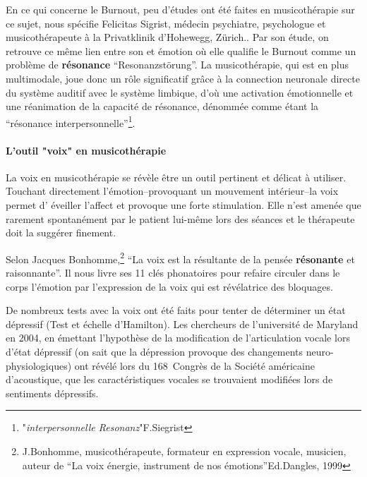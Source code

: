       En ce qui concerne le Burnout, peu d'études ont été faites en musicothérapie
sur ce sujet, nous spécifie Felicitas Sigrist, médecin
psychiatre, psychologue et musicothérapeute à la Privatklinik
d'Hohewegg, Zürich.\autocite[pp.55--90] {sigrist_burnout_2016}. Par son étude, on retrouve ce 
	même lien entre son et 
émotion où elle qualifie le Burnout comme un problème de \textbf{résonance} ``Resonanzstörung''. La 
musicothérapie, qui est en plus multimodale, joue donc un rôle significatif grâce à la 
connection 
neuronale directe du système auditif avec le système limbique, d'où une activation 
émotionnelle et une  réanimation de  la capacité de résonance, dénommée comme 
étant la 
``résonance interpersonnelle''\footnote{"\textit{interpersonnelle Resonanz}"F.Siegrist}.

\paragraph{L'outil "voix" en musicothérapie}

La voix en musicothérapie se révèle être un outil pertinent et délicat
à utiliser. Touchant 
directement 
l'émotion--provoquant un mouvement intérieur--la voix permet d'
éveiller l'affect
et provoque une forte stimulation. Elle n'est amenée que rarement
spontanément par le patient lui-même lors des séances et le thérapeute doit la suggérer
finement.

Selon Jacques Bonhomme,\footnote{J.Bonhomme, musicothérapeute, formateur 
  	en expression vocale, musicien, auteur de ``La voix énergie,
        instrument de nos émotions''Ed.Dangles, 1999} ``La voix est la
      résultante de la pensée \textbf{résonante}  et raisonnante''.
      Il nous livre ses 11 clés phonatoires pour refaire circuler dans
      le corps 
      l'émotion par l'expression de la voix qui est révélatrice des bloquages.

De nombreux tests avec 
la voix
 ont été faits pour tenter de déterminer un état dépressif 
(Test et échelle d'Hamilton). Les chercheurs de l'université de Maryland en 
2004,
en émettant l'hypothèse de la modification de l'articulation vocale 
lors d'état dépressif (on sait que la dépression provoque des changements  
neuro-physiologiques) ont révélé lors du 168\ieme\ Congrès de la Société
américaine d'acoustique, que les caractéristiques 
vocales se trouvaient modifiées lors de sentiments 
dépressifs\autocite{le_service_metronews}.




